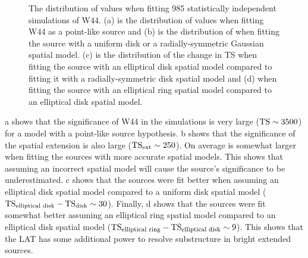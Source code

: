\begin{figure}[htbp]
    \fi
    \caption{
    The distribution of \ts values when fitting 985 statistically
    independent simulations of W44. (a) is the distribution of \ts values
    when fitting W44 as a point-like source and (b) is the
    distribution of \tsext when fitting the source with a uniform disk or a 
    radially-symmetric Gaussian
    spatial model. (c) is the distribution of the change in TS when
    fitting the source with an elliptical disk spatial model compared to
    fitting it with a radially-symmetric disk spatial model and (d) 
    when fitting the source with an elliptical ring spatial model compared
    to an elliptical disk spatial model.
    }
\end{figure}


a 
shows that
the significance of W44 in the simulations is very large ($\mathrm{TS}\sim3500$) 
for a model with a point-like source hypothesis.
b shows that 
the significance of the spatial extension is also large
($\mathrm{TS}_\mathrm{ext}\sim250$).  
On average \tsext is somewhat larger when fitting
the sources with more accurate spatial models.  This shows that
assuming an incorrect spatial model will cause the source's
significance to be underestimated.  c
shows that the sources were fit better when assuming an elliptical
disk spatial model compared to a uniform disk spatial model
($\ts_\text{elliptical\ disk}-\ts_\text{disk}\sim30$).  Finally,
d shows that the sources were
fit somewhat better assuming an elliptical ring spatial model
compared to an elliptical disk spatial model ($\mathrm{TS}_\text{elliptical\
ring}-\mathrm{TS}_\text{elliptical\ disk}\sim9$). This shows that the LAT has
some additional power to resolve substructure in bright extended sources.

